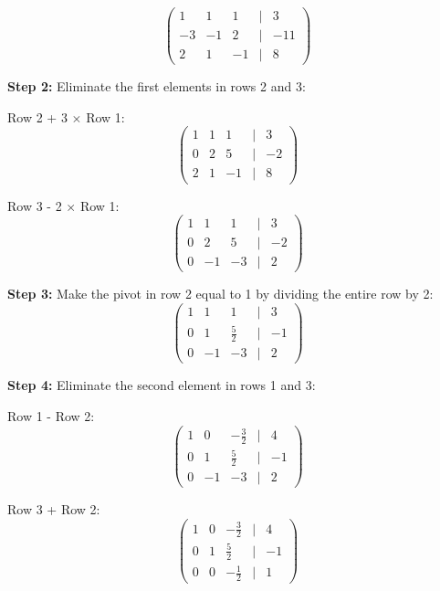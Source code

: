 \begin{equation*}
\begin{pmatrix}
1 & 1 & 1 & | & 3 \\
-3 & -1 & 2 & | & -11 \\
2 & 1 & -1 & | & 8
\end{pmatrix}
\end{equation*}

\textbf{Step 2:} Eliminate the first elements in rows 2 and 3:

Row 2 + 3 \(\times\) Row 1:
\begin{equation*}
\begin{pmatrix}
1 & 1 & 1 & | & 3 \\
0 & 2 & 5 & | & -2 \\
2 & 1 & -1 & | & 8
\end{pmatrix}
\end{equation*}

Row 3 - 2 \(\times\) Row 1:
\begin{equation*}
\begin{pmatrix}
1 & 1 & 1 & | & 3 \\
0 & 2 & 5 & | & -2 \\
0 & -1 & -3 & | & 2
\end{pmatrix}
\end{equation*}

\textbf{Step 3:} Make the pivot in row 2 equal to 1 by dividing the entire row by 2:
\begin{equation*}
\begin{pmatrix}
1 & 1 & 1 & | & 3 \\
0 & 1 & \frac{5}{2} & | & -1 \\
0 & -1 & -3 & | & 2
\end{pmatrix}
\end{equation*}

\textbf{Step 4:} Eliminate the second element in rows 1 and 3:

Row 1 - Row 2:
\begin{equation*}
\begin{pmatrix}
1 & 0 & -\frac{3}{2} & | & 4 \\
0 & 1 & \frac{5}{2} & | & -1 \\
0 & -1 & -3 & | & 2
\end{pmatrix}
\end{equation*}

Row 3 + Row 2:
\begin{equation*}
\begin{pmatrix}
1 & 0 & -\frac{3}{2} & | & 4 \\
0 & 1 & \frac{5}{2} & | & -1 \\
0 & 0 & -\frac{1}{2} & | & 1
\end{pmatrix}
\end{equation*}

